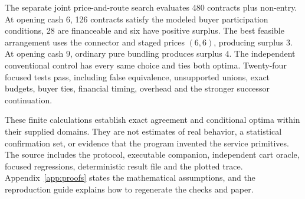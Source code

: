 The separate joint price-and-route search evaluates 480 contracts plus non-entry. At opening cash $6$, 126 contracts satisfy the modeled buyer participation conditions, 28 are financeable and six have positive surplus. The best feasible arrangement uses the connector and staged prices $(6,6)$, producing surplus $3$. At opening cash $9$, ordinary pure bundling produces surplus $4$. The independent conventional control has every same choice and ties both optima. Twenty-four focused tests pass, including false equivalence, unsupported unions, exact budgets, buyer ties, financial timing, overhead and the stronger successor continuation.

These finite calculations establish exact agreement and conditional optima within their supplied domains. They are not estimates of real behavior, a statistical confirmation set, or evidence that the program invented the service primitives. The source includes the protocol, executable companion, independent cart oracle, focused regressions, deterministic result file and the plotted trace. Appendix~\ref{app:proofs} states the mathematical assumptions, and the reproduction guide explains how to regenerate the checks and paper.
